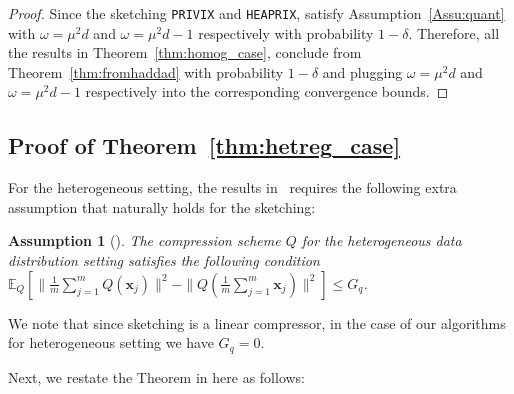 \documentclass[twoside]{article}
\newtheorem{assumption}{Assumption}
\begin{document}
\begin{proof}
Since the sketching \texttt{PRIVIX} and \texttt{HEAPRIX}, satisfy Assumption~\ref{Assu:quant} with $\omega=\mu^2d$ and $\omega=\mu^2d-1$ respectively with probability $1-\delta$.  Therefore, all the results in Theorem~\ref{thm:homog_case}, conclude from Theorem~\ref{thm:fromhaddad} with probability $1-\delta$ and plugging $\omega=\mu^2d$ and $\omega=\mu^2d-1$ respectively into the corresponding convergence bounds.
\end{proof}


\subsection{Proof of Theorem~\ref{thm:hetreg_case}}
For the heterogeneous setting, the results in~\cite{haddadpour2020federated} requires the following extra assumption that naturally holds for the sketching: 

\begin{assumption}[\cite{haddadpour2020federated}]\label{assum:009}
The compression scheme $Q$ for the heterogeneous data distribution setting satisfies the following condition $
    \mathbb{E}_Q[\|\frac{1}{m}\sum_{j=1}^m Q(\boldsymbol{x}_j)\|^2-\|Q(\frac{1}{m}\sum_{j=1}^m \boldsymbol{x}_j)\|^2]\leq G_q$.
\end{assumption}
We note that since sketching is a linear compressor, in the case of our algorithms for heterogeneous setting we have $G_q=0$. 

\newpage

Next, we restate the Theorem in \cite{haddadpour2020federated} here as follows:
\end{document}
